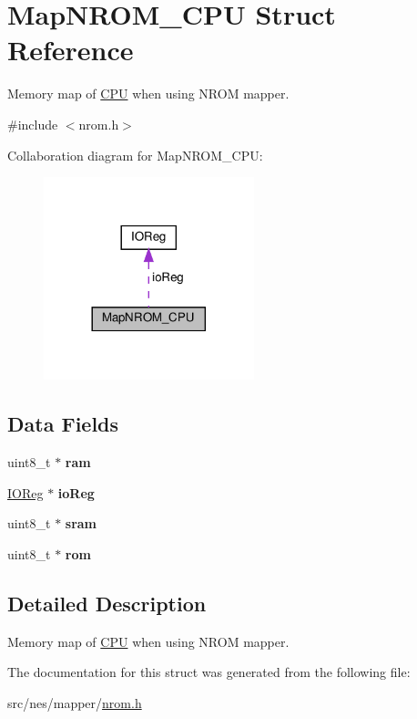 \hypertarget{struct_map_n_r_o_m___c_p_u}{}\section{Map\+N\+R\+O\+M\+\_\+\+C\+PU Struct Reference}
\label{struct_map_n_r_o_m___c_p_u}


Memory map of \hyperlink{struct_c_p_u}{C\+PU} when using N\+R\+OM mapper.  




{\ttfamily \#include $<$nrom.\+h$>$}



Collaboration diagram for Map\+N\+R\+O\+M\+\_\+\+C\+PU\+:\nopagebreak
\begin{figure}[H]
\begin{center}
\leavevmode
\includegraphics[width=173pt]{struct_map_n_r_o_m___c_p_u__coll__graph}
\end{center}
\end{figure}
\subsection*{Data Fields}
\begin{DoxyCompactItemize}
\item 
\mbox{\label{struct_map_n_r_o_m___c_p_u_adab6a729af9f9f093a789113341473de}} 
uint8\+\_\+t $\ast$ {\bfseries ram}
\item 
\mbox{\label{struct_map_n_r_o_m___c_p_u_a8ca82c9835d272c0333147840355f411}} 
\hyperlink{struct_i_o_reg}{I\+O\+Reg} $\ast$ {\bfseries io\+Reg}
\item 
\mbox{\label{struct_map_n_r_o_m___c_p_u_a089eb276a325916466365816fb314059}} 
uint8\+\_\+t $\ast$ {\bfseries sram}
\item 
\mbox{\label{struct_map_n_r_o_m___c_p_u_a95644251ecc17b2b3203dd6f34351183}} 
uint8\+\_\+t $\ast$ {\bfseries rom}
\end{DoxyCompactItemize}


\subsection{Detailed Description}
Memory map of \hyperlink{struct_c_p_u}{C\+PU} when using N\+R\+OM mapper. 

The documentation for this struct was generated from the following file\+:\begin{DoxyCompactItemize}
\item 
src/nes/mapper/\hyperlink{nrom_8h}{nrom.\+h}\end{DoxyCompactItemize}
